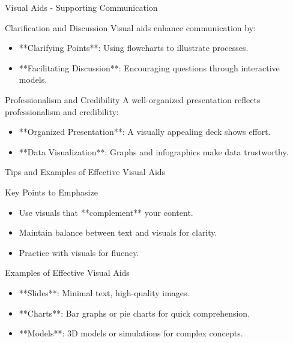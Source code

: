 \documentclass[aspectratio=169]{beamer}
\begin{document}
\begin{frame}[fragile]{Visual Aids - Supporting Communication}
    \begin{block}{Clarification and Discussion}
        Visual aids enhance communication by:
        \begin{itemize}
            \item **Clarifying Points**: Using flowcharts to illustrate processes.
            \item **Facilitating Discussion**: Encouraging questions through interactive models.
        \end{itemize}
    \end{block}
    
    \begin{block}{Professionalism and Credibility}
        A well-organized presentation reflects professionalism and credibility:
        \begin{itemize}
            \item **Organized Presentation**: A visually appealing deck shows effort.
            \item **Data Visualization**: Graphs and infographics make data trustworthy.
        \end{itemize}
    \end{block}
\end{frame}

\begin{frame}[fragile]{Tips and Examples of Effective Visual Aids}
    \begin{block}{Key Points to Emphasize}
        \begin{itemize}
            \item Use visuals that **complement** your content.
            \item Maintain balance between text and visuals for clarity.
            \item Practice with visuals for fluency.
        \end{itemize}
    \end{block}
    
    \begin{block}{Examples of Effective Visual Aids}
        \begin{itemize}
            \item **Slides**: Minimal text, high-quality images.
            \item **Charts**: Bar graphs or pie charts for quick comprehension.
            \item **Models**: 3D models or simulations for complex concepts.
        \end{itemize}
    \end{block}
\end{frame}
\end{document}
